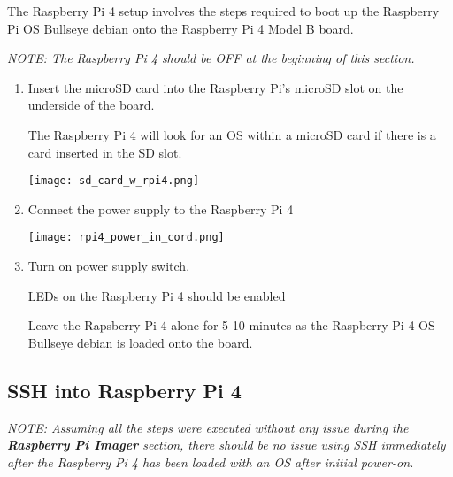 \documentclass[journal]{IEEEtran}
\begin{document}
    The Raspberry Pi 4 setup involves the steps required to boot up the Raspberry Pi OS Bullseye debian onto the Raspberry Pi 4 Model B board.

    \emph{NOTE: The Raspberry Pi 4 should be OFF at the beginning of this section.} \newline


    \begin{enumerate}
        \item Insert the microSD card into the Raspberry Pi's microSD slot on the underside of the board. \newline 
        
        The Raspberry Pi 4 will look for an OS within a microSD card if there is a card inserted in the SD slot. \newline

        \texttt{[image: sd\_card\_w\_rpi4.png]}

        \item Connect the power supply to the Raspberry Pi 4 \newline
        
        \texttt{[image: rpi4\_power\_in\_cord.png]}

        \item Turn on power supply switch. \newline
        
        LEDs on the Raspberry Pi 4 should be enabled \newline

        Leave the Rapsberry Pi 4 alone for 5-10 minutes as the Raspberry Pi 4 OS Bullseye debian is loaded onto the board.

    \end{enumerate}

    \subsection{SSH into Raspberry Pi 4}

    \emph{NOTE: Assuming all the steps were executed without any issue during the \textbf{Raspberry Pi Imager} section, there should be no issue using SSH immediately after the Raspberry Pi 4 has been loaded with an OS after initial power-on.} \newline
\end{document}
